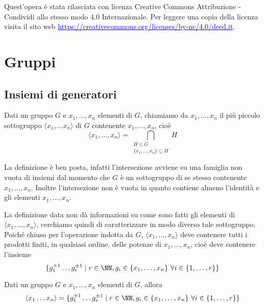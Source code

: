 \documentclass[11pt]{scrartcl}
\begin{document}
	Quest'opera è stata rilasciata con licenza Creative Commons Attribuzione - Condividi allo stesso modo 4.0 Internazionale. Per leggere
	una copia della licenza visita il sito web \href{http://creativecommons.org/licenses/by-sa/4.0/deed.it}{\textcolor{blue}{https://creativecommons.org/licenses/by-nc/4.0/deed.it}}.\\
	
	\newpage
	
	\section{Gruppi}
	
	\subsection{Insiemi di generatori}
	
	\begin{definition}
		Dati un gruppo $G$ e $x_1, \ldots, x_n$ elementi di $G$, chiamiamo  da $x_1, \ldots, x_n$ il più piccolo sottogruppo $\langle x_1, \ldots x_n
		\rangle$ di $G$ contenente $x_1, \ldots, x_n$, cioè \[\langle x_1, \ldots, x_n\rangle =
		\bigcap_{\substack{H\leqslant G\\ \{x_1, \ldots, x_n\} \subseteq H}} H\] 
	\end{definition}
	
	\begin{remark}
		La definizione è ben posta, infatti l'intersezione avviene su una 
		famiglia non vuota di insiemi dal momento che $G$ è un sottogruppo di 
		se stesso contenente $x_1, \ldots, x_n$. Inoltre l'intersezione non è vuota in 
		quanto contiene almeno l'identità e gli elementi $x_1, \ldots, x_n$.
	\end{remark}
	
	La definizione data non dà informazioni su come sono fatti gli elementi di 
	$\langle x_1, \ldots, x_n\rangle$, cerchiamo quindi di caratterizzare in modo
	diverso tale sottogruppo. Poiché chiuso per l'operazione indotta da $G$, $\langle x_1, \ldots, x_n\rangle$
	deve contenere tutti i prodotti finiti, in qualsiasi ordine, delle potenze di
	$x_1, \ldots, x_n$, cioè deve contenere l'insieme 
	\[\{g_1^{\pm 1} \ldots g_r^{\pm 1}\mid r \in \NN, g_i \in \{x_1, \ldots, x_n\}
	~\forall i \in \{1, \ldots, r\}\}\]
	
	\begin{proposition}
		Dati un gruppo $G$ e $x_1, \ldots, x_n$ elementi di $G$, allora \[
		\langle x_1 \ldots x_n\rangle = \{g_1^{\pm 1} \ldots g_r^{\pm 1}\mid r 
		\in \NN, g_i \in \{x_1, \ldots, x_n\}~\forall i \in \{1, \ldots, r\}\}
		\]
	\end{proposition}
	
\end{document}
